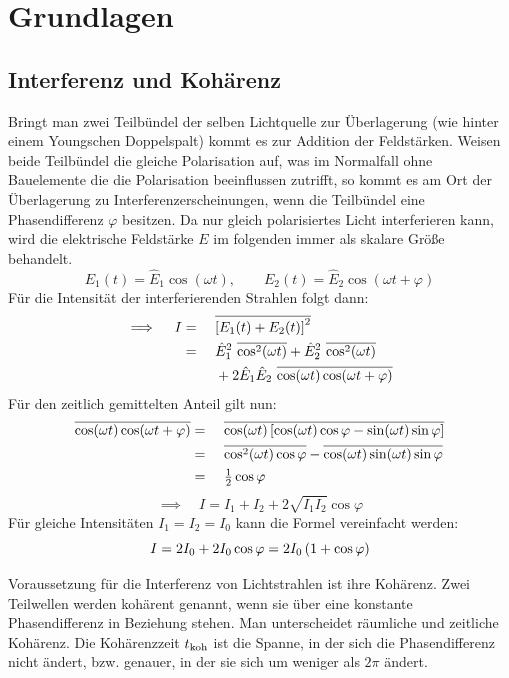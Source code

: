 \section{Grundlagen} %
\label{sec:grundlagen}

	\subsection{Interferenz und Kohärenz} %
	\label{sub:interferenz_und_koh_renz}
		
		Bringt man zwei Teilbündel der selben Lichtquelle zur Überlagerung (wie hinter einem Youngschen Doppelspalt) kommt es zur Addition der Feldstärken. 
		Weisen beide Teilbündel die gleiche Polarisation auf, was im Normalfall ohne Bauelemente die die Polarisation beeinflussen zutrifft, so kommt es am Ort der Überlagerung zu Interferenzerscheinungen, wenn die Teilbündel eine Phasendifferenz $\varphi$ besitzen.
		Da nur gleich polarisiertes Licht interferieren kann, wird die elektrische Feldstärke $E$ im folgenden immer als skalare Größe behandelt.
		\[ E_1(t) = \hat{E}_1 \cos(\omega t),\qquad E_2(t) = \hat{E}_2 \cos(\omega t + \varphi) \]%
		Für die Intensität der interferierenden Strahlen folgt dann:
		\begin{alignat*}{3}
			\implies \quad I &=&&\ \overline{\boxb{E_1(t) + E_2(t)}^2} \\
				&=&&\  \hat{E}^2_1\ \overline{\cos^2(\omega t)} + \hat{E}^2_2\ \overline{\cos^2(\omega t)} \\
				& &&\ + 2\hat{E}_1 \hat{E}_2\ \overline{\cos(\omega t)\cos(\omega t + \varphi)}
		\end{alignat*}
		Für den zeitlich gemittelten Anteil gilt nun:
		\begin{alignat*}{3}
			\overline{\cos(\omega t)\cos(\omega t + \varphi)} &=&&\ \overline{\cos(\omega t)\left[ \cos (\omega t) \cos \varphi - \sin (\omega t) \sin \varphi  \right] }\\
				&=&&\ \overline{\cos^2 (\omega t) \cos \varphi} - \overline{\cos (\omega t) \sin (\omega t) \sin \varphi} \\
				&=&&\ \tfrac{1}{2}\cos \varphi
		\end{alignat*}
		 \[ \implies \quad I = I_1 + I_2 + 2 \sqrt{I_1 I_2} \cos \varphi \]
		 Für gleiche Intensitäten $I_1 = I_2 = I_0$ kann die Formel vereinfacht werden:
		 \[ I = 2 I_0 + 2 I_0 \cos\varphi = 2 I_0 \left( 1 + \cos\varphi \right) \]

		 Voraussetzung für die Interferenz von Lichtstrahlen ist ihre Kohärenz.
		 Zwei Teilwellen werden kohärent genannt, wenn sie über eine konstante Phasendifferenz in Beziehung stehen.
		 Man unterscheidet räumliche und zeitliche Kohärenz.
		 Die Kohärenzzeit $t_{\mathrm{koh}} $ ist die Spanne, in der sich die Phasendifferenz nicht ändert, bzw. genauer, in der sie sich um weniger als $2 \pi $ ändert.

